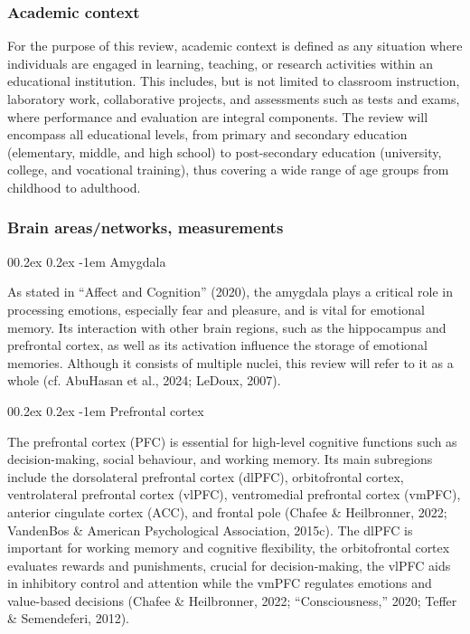 \documentclass[
  stu, a4paper, 12pt,mask,floatsintext]{apa7}
\makeatletter
\let\oldparagraph\paragraph
\renewcommand{\paragraph}[1]{\oldparagraph{#1}\mbox{}}
\renewcommand{\paragraph}{\@startsection{paragraph}{4}{\parindent}%
  {0\baselineskip \@plus 0.2ex \@minus 0.2ex}%
  {-1em}%
  {\normalfont\normalsize\bfseries\itshape\typesectitle}}
\renewcommand{\paragraph}{\@startsection{paragraph}{4}{\parindent}%
  {0\baselineskip \@plus 0.2ex \@minus 0.2ex}%
  {-1em}%
  {\normalfont\normalsize\bfseries\typesectitle}}
\makeatother
\begin{document}
\subsubsection{Academic context}\label{academic-context}

For the purpose of this review, academic context is defined as any situation where individuals are engaged in learning, teaching, or research activities within an educational institution. This includes, but is not limited to classroom instruction, laboratory work, collaborative projects, and assessments such as tests and exams, where performance and evaluation are integral components. The review will encompass all educational levels, from primary and secondary education (elementary, middle, and high school) to post-secondary education (university, college, and vocational training), thus covering a wide range of age groups from childhood to adulthood.

\subsubsection{Brain areas/networks, measurements}\label{brain-areasnetworks-measurements}

\paragraph{Amygdala}\label{amygdala}

As stated in {``Affect and Cognition''} (2020), the amygdala plays a critical role in processing emotions, especially fear and pleasure, and is vital for emotional memory.
Its interaction with other brain regions, such as the hippocampus and prefrontal cortex, as well as its activation influence the storage of emotional memories.
Although it consists of multiple nuclei, this review will refer to it as a whole (cf. AbuHasan et al., 2024; LeDoux, 2007).

\paragraph{Prefrontal cortex}\label{prefrontal-cortex}

The prefrontal cortex (PFC) is essential for high-level cognitive functions such as decision-making, social behaviour, and working memory.
Its main subregions include the dorsolateral prefrontal cortex (dlPFC), orbitofrontal cortex, ventrolateral prefrontal cortex (vlPFC), ventromedial prefrontal cortex (vmPFC), anterior cingulate cortex (ACC), and frontal pole (Chafee \& Heilbronner, 2022; VandenBos \& American Psychological Association, 2015c).
The dlPFC is important for working memory and cognitive flexibility, the orbitofrontal cortex evaluates rewards and punishments, crucial for decision-making, the vlPFC aids in inhibitory control and attention while the vmPFC regulates emotions and value-based decisions (Chafee \& Heilbronner, 2022; {``Consciousness,''} 2020; Teffer \& Semendeferi, 2012).
\end{document}
